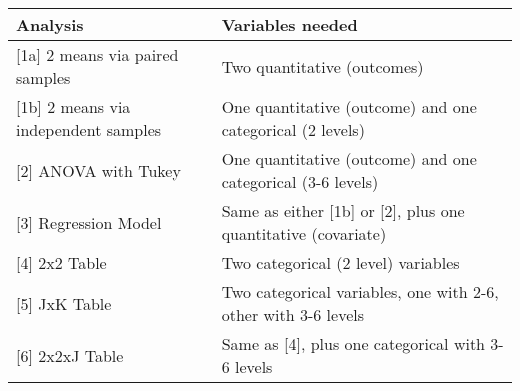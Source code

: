 \documentclass[]{book}
\begin{document}
\begin{longtable}[]{@{}ll@{}}
\toprule
\begin{minipage}[b]{0.42\columnwidth}\raggedright
Analysis\strut
\end{minipage} & \begin{minipage}[b]{0.52\columnwidth}\raggedright
Variables needed\strut
\end{minipage}\tabularnewline
\midrule
\endhead
\begin{minipage}[t]{0.42\columnwidth}\raggedright
{[}1a{]} 2 means via paired samples\strut
\end{minipage} & \begin{minipage}[t]{0.52\columnwidth}\raggedright
Two quantitative (outcomes)\strut
\end{minipage}\tabularnewline
\begin{minipage}[t]{0.42\columnwidth}\raggedright
{[}1b{]} 2 means via independent samples\strut
\end{minipage} & \begin{minipage}[t]{0.52\columnwidth}\raggedright
One quantitative (outcome) and one categorical (2 levels)\strut
\end{minipage}\tabularnewline
\begin{minipage}[t]{0.42\columnwidth}\raggedright
{[}2{]} ANOVA with Tukey\strut
\end{minipage} & \begin{minipage}[t]{0.52\columnwidth}\raggedright
One quantitative (outcome) and one categorical (3-6 levels)\strut
\end{minipage}\tabularnewline
\begin{minipage}[t]{0.42\columnwidth}\raggedright
{[}3{]} Regression Model\strut
\end{minipage} & \begin{minipage}[t]{0.52\columnwidth}\raggedright
Same as either {[}1b{]} or {[}2{]}, plus one quantitative (covariate)\strut
\end{minipage}\tabularnewline
\begin{minipage}[t]{0.42\columnwidth}\raggedright
{[}4{]} 2x2 Table\strut
\end{minipage} & \begin{minipage}[t]{0.52\columnwidth}\raggedright
Two categorical (2 level) variables\strut
\end{minipage}\tabularnewline
\begin{minipage}[t]{0.42\columnwidth}\raggedright
{[}5{]} JxK Table\strut
\end{minipage} & \begin{minipage}[t]{0.52\columnwidth}\raggedright
Two categorical variables, one with 2-6, other with 3-6 levels\strut
\end{minipage}\tabularnewline
\begin{minipage}[t]{0.42\columnwidth}\raggedright
{[}6{]} 2x2xJ Table\strut
\end{minipage} & \begin{minipage}[t]{0.52\columnwidth}\raggedright
Same as {[}4{]}, plus one categorical with 3-6 levels\strut
\end{minipage}\tabularnewline
\bottomrule
\end{longtable}
\end{document}
